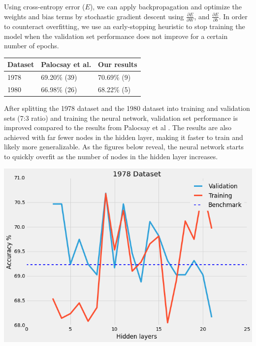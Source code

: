 \documentclass[a0,landscape]{a0poster}
\begin{document}
\begin{multicols}{4}
Using cross-entropy error ($E$), we can apply backpropagation and optimize the weights and bias terms by stochastic gradient descent using $\frac{\partial E}{\partial W}$, and $\frac{\partial E}{\partial b}$. In order to counteract overfitting, we use an early-stopping heuristic to stop training the model when the validation set performance does not improve for a certain number of epochs.

\begin{table} %
\begin{tabular}{l l l}
\toprule
\textbf{Dataset} & \textbf{Palocsay et al.} & \textbf{Our results}\\
\midrule
1978 & 69.20\% (39) & 70.69\% (9) \\
1980 & 66.98\% (26) & 68.22\% (5) \\
\bottomrule
\end{tabular}
\end{table}

After splitting the 1978 dataset and the 1980 dataset into training and validation sets (7:3 ratio) and training the neural network, validation set performance is improved compared to the results from Palocsay et al \cite{bib1}. The results are also achieved with far fewer nodes in the hidden layer, making it faster to train and likely more generalizable. As the figures below reveal, the neural network starts to quickly overfit as the number of nodes in the hidden layer increases.

\begin{center}\vspace{1cm}
\includegraphics[width=0.9\linewidth]{1978}
\end{center}\vspace{1cm}


\end{multicols}
\end{document}
